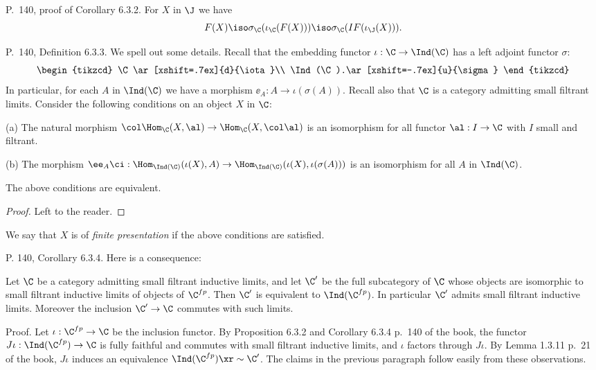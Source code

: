 \documentclass[12pt]{article}
\theoremstyle{remark}
\theoremstyle{definition}
\begin{document}
%

\begin{s} 
P.~140, proof of Corollary 6.3.2. For $X$ in $\J$ we have 
$$
F(X)\iso\sigma_\C(\iota_\C(F(X)))\iso\sigma_\C(IF(\iota_\J(X))).
$$
\end{s}

%

\begin{s} 
P.~140, Definition 6.3.3. We spell out some details. Recall that the embedding functor $\iota:\C\to\Ind(\C)$ has a left adjoint functor $\sigma$:
$$
\begin{tikzcd}
\C\ar[xshift=.7ex]{d}{\iota}\\ 
\Ind(\C).\ar[xshift=-.7ex]{u}{\sigma}
\end{tikzcd}
$$ 
In particular, for each $A$ in $\Ind(\C)$ we have a morphism $\ee_A:A\to\iota(\sigma(A))$. Recall also that $\C$ is a category admitting small filtrant limits. Consider the following conditions on an object $X$ in $\C$:

\nn(a) The natural morphism $\col\Hom_\C(X,\al)\to\Hom_\C(X,\col\al)$ is an isomorphism for all functor $\al:I\to\C$ with $I$ small and filtrant.

\nn(b) The morphism $\ee_A\ci:\Hom_{\Ind(\C)}(\iota(X),A)\to\Hom_{\Ind(\C)}(\iota(X),\iota(\sigma(A)))$ is an isomorphism for all $A$ in $\Ind(\C)$.
\begin{lem}
The above conditions are equivalent.
\end{lem}
\begin{proof}
Left to the reader.
\end{proof} 
\begin{df}
We say that $X$ is of \emph{finite presentation} if the above conditions are satisfied.
\end{df}
\end{s}

%

\begin{s}
P. 140, Corollary 6.3.4. Here is a consequence:

Let $\C$ be a category admitting small filtrant inductive limits, and let $\C'$ be the full subcategory of $\C$ whose objects are isomorphic to small filtrant inductive limits of objects of $\C^{fp}$. Then $\C'$ is equivalent to $\Ind(\C^{fp})$. In particular $\C'$ admits small filtrant inductive limits. Moreover the inclusion $\C'\to\C$ commutes with such limits.

Proof. Let $\iota:\C^{fp}\to\C$ be the inclusion functor. By Proposition 6.3.2 and Corollary 6.3.4 p.~140 of the book, the functor $J\iota:\Ind(\C^{fp})\to\C$ is fully faithful and commutes with small filtrant inductive limits, and $\iota$ factors through $J\iota$. By Lemma 1.3.11 p.~21 of the book, $J\iota$ induces an equivalence $\Ind(\C^{fp})\xr\sim\C'$. The claims in the previous paragraph follow easily from these observations.
\end{s}
\end{document}
